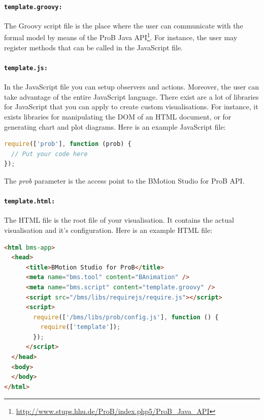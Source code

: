 \paragraph{\texttt{template.groovy:}}
The Groovy script file is the place where the user can communicate with the formal model by means of the ProB Java API\footnote{\url{http://www.stups.hhu.de/ProB/index.php5/ProB_Java_API}}.
For instance, the user may register methods that can be called in the JavaScript file.

\paragraph{\texttt{template.js:}}
In the JavaScript file you can setup observers and actions.
Moreover, the user can take advantage of the entire JavaScript language.
There exist are a lot of libraries for JavaScript that you can apply to create custom visualisations.
For instance, it exists libraries for manipulating the DOM of an HTML document, or for generating chart and plot diagrams.
Here is an example JavaScript file:

\begin{lstlisting}[language=JavaScript]
require(['prob'], function (prob) {
  // Put your code here
});
\end{lstlisting}

The \textit{prob} parameter is the access point to the BMotion Studio for ProB API.

\paragraph{\texttt{template.html:}}
The HTML file is the root file of your visualisation. It contains the actual visualisation and it's configuration.
Here is an example HTML file:

\begin{lstlisting}[language=html]
<html bms-app>
  <head>
      <title>BMotion Studio for ProB</title>
      <meta name="bms.tool" content="BAnimation" />
      <meta name="bms.script" content="template.groovy" />
      <script src="/bms/libs/requirejs/require.js"></script>
      <script>
        require(['/bms/libs/prob/config.js'], function () {
          require(['template']);
        });
      </script>
  </head>
  <body>
  </body>
</html>
\end{lstlisting}

